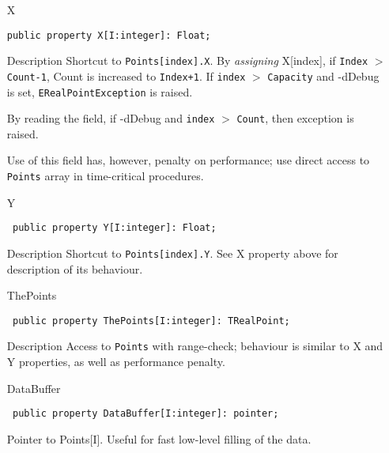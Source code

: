 \documentclass[12pt,a4paper,oneside]{report}
\newcommand{\declarationitem}[1]{{\addfontfeatures{FakeBold=1.3} #1}}
\newcommand{\descriptiontitle}[1]{{\addfontfeatures{FakeSlant}#1}}
\newcommand{\code}[1]{\texttt{#1}}
\begin{document}
\begin{itemize}
	\item[\declarationitem{X}\hfill]
	\begin{flushleft}
		\code{public property X[I:integer]: Float;}
	\end{flushleft}
	\item[\descriptiontitle{Description}]
	Shortcut to \code{Points[index].X}. By \textit{assigning} X[index], if  \code{Index} $>$ \code{Count-1}, Count is increased to \code{Index+1}. If \code{index} $>$ \code{Capacity} and -dDebug is set, \code{ERealPointException} is raised. 
	
	By reading the field, if -dDebug and \code{index} $>$ \code{Count}, then exception is raised.
	
	Use of this field has, however, penalty on performance; use direct access to \code{Points} array in time-critical procedures. 
	\par  \label{lmPointsVec.TPoints-Y}
	\item[\declarationitem{Y}\hfill]
	\begin{flushleft}
		\code{
			public property Y[I:integer]: Float;}
	\end{flushleft}
	\item[\descriptiontitle{Description}]
	Shortcut to \code{Points[index].Y}. See X property above for description of its behaviour. 
	\par  \label{lmPointsVec.TPoints-ThePoints}
	\item[\declarationitem{ThePoints}\hfill]
	\begin{flushleft}
		\code{
			public property ThePoints[I:integer]: TRealPoint;}
	\end{flushleft}
	\item[\descriptiontitle{Description}]
	Access to \code{Points} with range-check; behaviour is similar to X and Y properties, as well as performance penalty.
	\par  \label{lmPointsVec.TPoints-DataBuffer}
	\item[\declarationitem{DataBuffer}\hfill]
	\begin{flushleft}
		\code{
			public property DataBuffer[I:integer]: pointer;}
	\end{flushleft}
	Pointer to Points[I]. Useful for fast low-level filling of the data.
\end{itemize}
	
\end{document}

